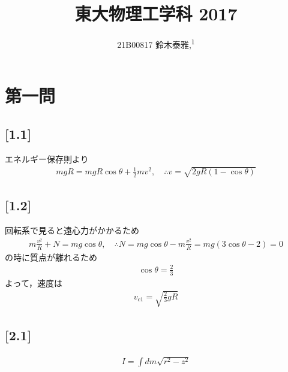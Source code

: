 \documentclass[12pt,dvipdfmx]{jsarticle}
\newcommand\authormark[1]{\textsuperscript{#1}}
\begin{document}
\title{東大物理工学科 2017}

\author{21B00817 鈴木泰雅,\authormark{1}}
\section*{\Large{第一問}}
\subsection*{\large{[1.1]}}
エネルギー保存則より
\begin{eqnarray}
  mgR = mgR\cos\theta + \frac{1}{2}mv^2, \quad\therefore v = \sqrt{2gR(1-\cos\theta)}
\end{eqnarray}
\subsection*{\large{[1.2]}}
回転系で見ると遠心力がかかるため
\begin{eqnarray}
  m\frac{v^2}{R} + N = mg\cos\theta, \quad\therefore N = mg\cos\theta-m\frac{v^2}{R} = mg(3\cos\theta-2) =0
\end{eqnarray}
の時に質点が離れるため
\begin{eqnarray}
  \cos\theta = \frac{2}{3}
\end{eqnarray}
よって，速度は
\begin{eqnarray}
  v_{c1} = \sqrt{ \frac{2}{3}gR}
\end{eqnarray}
\subsection*{\large{[2.1]}}
\begin{eqnarray}
  I = \int dm \sqrt{r^2-z^2}
\end{eqnarray}
\end{document}
